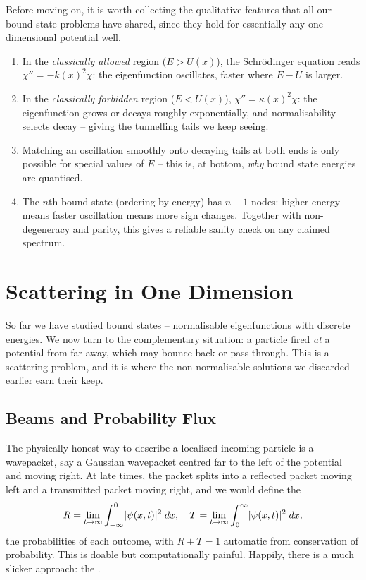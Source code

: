 \documentclass[a4paper]{scrartcl}
\begin{document}
Before moving on, it is worth collecting the qualitative features that all our bound state problems have shared, since they hold for essentially any one-dimensional potential well.
\begin{enumerate}[label=(\roman*)]
    \item In the \emph{classically allowed} region ($E > U(x)$), the Schr\"odinger equation reads $\chi'' = -k(x)^2 \chi$: the eigenfunction oscillates, faster where $E - U$ is larger.
    \item In the \emph{classically forbidden} region ($E < U(x)$), $\chi'' = \kappa(x)^2 \chi$: the eigenfunction grows or decays roughly exponentially, and normalisability selects decay -- giving the tunnelling tails we keep seeing.
    \item Matching an oscillation smoothly onto decaying tails at both ends is only possible for special values of $E$ -- this is, at bottom, \emph{why} bound state energies are quantised.
    \item The $n$th bound state (ordering by energy) has $n - 1$ nodes: higher energy means faster oscillation means more sign changes. Together with non-degeneracy and parity, this gives a reliable sanity check on any claimed spectrum.
\end{enumerate}

\section{Scattering in One Dimension}

So far we have studied bound states -- normalisable eigenfunctions with discrete energies. We now turn to the complementary situation: a particle fired \emph{at} a potential from far away, which may bounce back or pass through. This is a scattering problem, and it is where the non-normalisable solutions we discarded earlier earn their keep.

\subsection{Beams and Probability Flux}

The physically honest way to describe a localised incoming particle is a wavepacket, say a Gaussian wavepacket centred far to the left of the potential and moving right. At late times, the packet splits into a reflected packet moving left and a transmitted packet moving right, and we would define the 
$$
R = \lim_{t \to \infty} \int_{-\infty}^{0} \lvert\psi(x,t)\rvert^2 \; d x, \quad T = \lim_{t \to \infty} \int_{0}^{\infty} \lvert\psi(x,t)\rvert^2 \; d x,
$$
the probabilities of each outcome, with $R + T = 1$ automatic from conservation of probability. This is doable but computationally painful. Happily, there is a much slicker approach: the .
\end{document}
